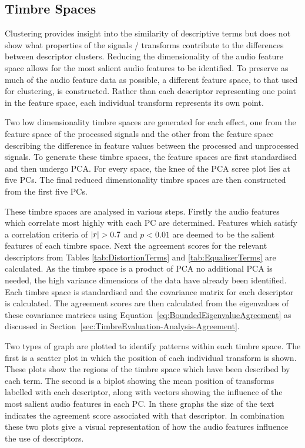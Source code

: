 	\subsection{Timbre Spaces}
	\label{sec:TimbreEvaluation-Analysis-TimbreSpaces}
		Clustering provides insight into the similarity of descriptive terms but does not show what properties of
		the signals / transforms contribute to the differences between descriptor clusters. Reducing the
		dimensionality of the audio feature space allows for the most salient audio features to be identified. To
		preserve as much of the audio feature data as possible, a different feature space, to that used for
		clustering, is constructed. Rather than each descriptor representing one point in the feature space, each
		individual transform represents its own point. 

		Two low dimensionality timbre spaces are generated for each effect, one from the feature space of the
		processed signals and the other from the feature space describing the difference in feature values between
		the processed and unprocessed signals. To generate these timbre spaces, the feature spaces are first
		standardised and then undergo PCA. For every space, the knee of the PCA scree plot lies at five PCs. The
		final reduced dimensionality timbre spaces are then constructed from the first five PCs.

		These timbre spaces are analysed in various steps. Firstly the audio features which correlate most highly
		with each PC are determined. Features which satisfy a correlation criteria of $\left|r\right| > 0.7$ and $p <
		0.01$ are deemed to be the salient features of each timbre space. Next the agreement scores for the
		relevant descriptors from Tables \ref{tab:DistortionTerms} and \ref{tab:EqualiserTerms} are calculated. As
		the timbre space is a product of PCA no additional PCA is needed, the high variance dimensions of the data
		have already been identified. Each timbre space is standardised and the covariance matrix for each
		descriptor is calculated. The agreement scores are then calculated from the eigenvalues of these covariance
		matrices using Equation~\ref{eq:BoundedEigenvalueAgreement} as discussed in
		Section~\ref{sec:TimbreEvaluation-Analysis-Agreement}.
		
		Two types of graph are plotted to identify patterns within each timbre space. The first is a scatter plot
		in which the position of each individual transform is shown. These plots show the regions of the timbre
		space which have been described by each term. The second is a biplot showing the mean position of
		transforms labelled with each descriptor, along with vectors showing the influence of the most salient
		audio features in each PC. In these graphs the size of the text indicates the agreement score associated
		with that descriptor. In combination these two plots give a visual representation of how the audio features
		influence the use of descriptors.

